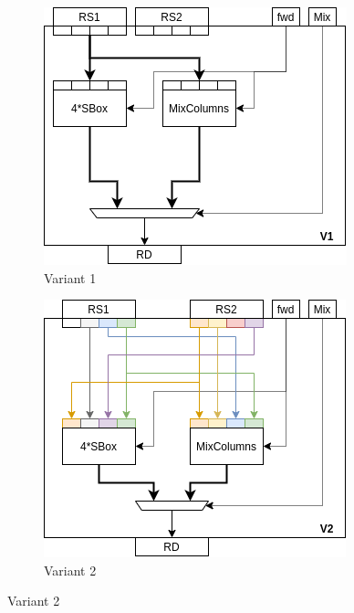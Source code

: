 \begin{figure}
\centering
\begin{subfigure}[t]{0.40\textwidth}
    \centering
    \includegraphics[width=\textwidth]{diagrams/ise-datapath-v1.png}
    \caption{Variant 1}
    \label{fig:design:fu_block:v1}
\end{subfigure}
\begin{subfigure}[t]{0.40\textwidth}
    \centering
    \includegraphics[width=\textwidth]{diagrams/ise-datapath-v2.png}
    \caption{Variant 2}
    \label{fig:design:fu_block:v2}
\end{subfigure}


\end{figure}
